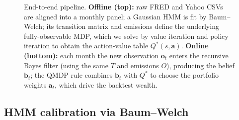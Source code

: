 \documentclass[11pt]{article}
\theoremstyle{plain1}
\theoremstyle{definition1}
\newcommand{\1}{\mathbf{1}}
\newcommand{\bel}{\mathbf{b}}
\begin{document}
\begin{figure}[H]
\caption{End-to-end pipeline. \textbf{Offline (top):} raw FRED and Yahoo CSVs are aligned into a monthly panel; a Gaussian HMM is fit by Baum--Welch; its transition matrix and emissions define the underlying fully-observable MDP, which we solve by value iteration and policy iteration to obtain the action-value table $Q^{\ast}(s,\mathbf{a})$. \textbf{Online (bottom):} each month the new observation $\mathbf{o}_t$ enters the recursive Bayes filter (using the same $T$ and emissions $O$), producing the belief $\bel_t$; the QMDP rule combines $\bel_t$ with $Q^{\ast}$ to choose the portfolio weights $\mathbf{a}_t$, which drive the backtest wealth.}\label{fig:pipeline}
\end{figure}

\subsection{HMM calibration via Baum--Welch}\label{sec:hmm}
\end{document}

